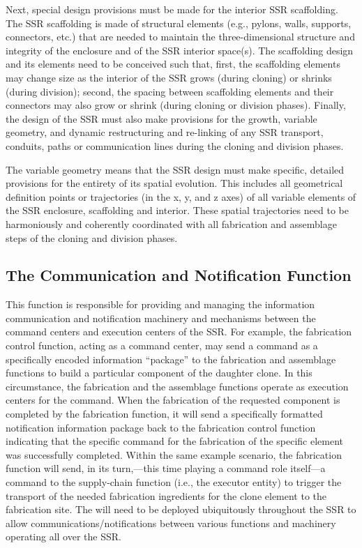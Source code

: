 Next, special design provisions must be made for the interior SSR
scaffolding. The SSR scaffolding is made of structural
elements (e.g., pylons, walls, supports, connectors, etc.) that are needed to
maintain the three-dimensional structure and integrity of the enclosure
and of the SSR interior space(s). The scaffolding design and its
elements need to be conceived such that, first, the scaffolding elements may
change size as the
interior of the SSR grows (during cloning) or shrinks (during division);
second, the spacing between scaffolding elements and their connectors may
also grow or shrink (during cloning or division phases).  
Finally, the design of the SSR must also make provisions for the growth,
variable geometry, and dynamic restructuring and re-linking of any SSR
transport, conduits, paths or communication lines during the cloning
and division phases.

The variable geometry means that the SSR design must make specific,
detailed provisions for the entirety of its spatial evolution. This includes all geometrical
definition points or trajectories (in the x, y, and z axes) of all variable
elements of the SSR enclosure, scaffolding and interior. These spatial
trajectories need to be harmoniously and coherently coordinated with
all fabrication and assemblage steps of the cloning and division
phases.

\subsection{The Communication and Notification Function}

This function is responsible for
providing and managing the information communication and notification
machinery and mechanisms between the command centers and execution
centers of the SSR. For example, the fabrication control 
function, acting as a command center, may send a command as a specifically
encoded information “package”  to the fabrication and assemblage
functions to build a particular component of the daughter clone. In
this circumstance, the fabrication and the assemblage functions operate
as execution centers for the command. When the fabrication of the
requested component is completed by the fabrication function, it will
send a specifically formatted notification information package back to
the fabrication control function indicating that the specific
command for the fabrication of the specific element was successfully
completed. Within the same example scenario, the fabrication function
will send, in its turn,---this time playing a command role itself---a
command to the supply-chain function (i.e., the executor entity) to trigger
the transport of the needed fabrication ingredients for the clone
element to the fabrication site. The  
will need to be deployed ubiquitously throughout the
SSR to allow communications/notifications between various functions and
machinery operating all over the SSR.

